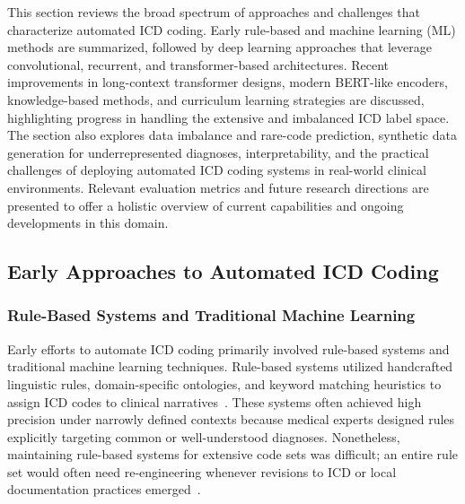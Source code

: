 This section reviews the broad spectrum of approaches and challenges that characterize automated ICD coding. Early rule-based and machine learning (ML) methods are summarized, followed by deep learning approaches that leverage convolutional, recurrent, and transformer-based architectures. Recent improvements in long-context transformer designs, modern BERT-like encoders, knowledge-based methods, and curriculum learning strategies are discussed, highlighting progress in handling the extensive and imbalanced ICD label space. The section also explores data imbalance and rare-code prediction, synthetic data generation for underrepresented diagnoses, interpretability, and the practical challenges of deploying automated ICD coding systems in real-world clinical environments. Relevant evaluation metrics and future research directions are presented to offer a holistic overview of current capabilities and ongoing developments in this domain.

\subsection{Early Approaches to Automated ICD Coding}\label{sec:p1:early-approaches}

\subsubsection{Rule-Based Systems and Traditional Machine Learning}

Early efforts to automate ICD coding primarily involved rule-based systems and traditional machine learning techniques. Rule-based systems utilized handcrafted linguistic rules, domain-specific ontologies, and keyword matching heuristics to assign ICD codes to clinical narratives~\citep{farkas2008automatic, scheurwegs2017data}. These systems often achieved high precision under narrowly defined contexts because medical experts designed rules explicitly targeting common or well-understood diagnoses. Nonetheless, maintaining rule-based systems for extensive code sets was difficult; an entire rule set would often need re-engineering whenever revisions to ICD or local documentation practices emerged~\citep{scheurwegs2017data}.

